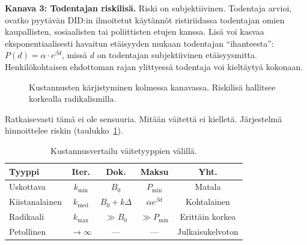 \documentclass[11pt,a4paper,twocolumn]{article}
\begin{document}
\textbf{Kanava 3: Todentajan riskilisä.} Riski on subjektiivinen. Todentaja arvioi, ovatko pyytävän DID:in ilmoitetut käytännöt ristiriidassa todentajan omien kaupallisten, sosiaalisten tai poliittisten etujen kanssa. Lisä voi kasvaa eksponentiaalisesti havaitun etäisyyden mukaan todentajan ``ihanteesta'': $P(d) = \alpha \cdot e^{\beta d}$, missä $d$ on todentajan subjektiivinen etäisyysmitta. Henkilökohtaisen ehdottoman rajan ylittyessä todentaja voi kieltäytyä kokonaan.

\begin{figure}[ht]
\centering
{}
\caption{Kustannusten kärjistyminen kolmessa kanavassa. Riskilisä hallitsee korkealla radikalismilla.}
\label{fig:radicalism}
\end{figure}

Ratkaisevasti tämä ei ole sensuuria. Mitään väitettä ei kielletä. Järjestelmä hinnoittelee riskin (taulukko~\ref{tab:costs}).

\begin{table}[ht]
\centering
\caption{Kustannusvertailu väitetyyppien välillä.}
\label{tab:costs}
\footnotesize
\begin{tabular}{@{}lcccc@{}}
\toprule
\textbf{Tyyppi} & \textbf{Iter.} & \textbf{Dok.} & \textbf{Maksu} & \textbf{Yht.} \\
\midrule
Uskottava & $k_{\min}$ & $B_0$ & $P_{\min}$ & Matala \\
Kiistanalainen & $k_{\text{med}}$ & $B_0{+}k\Delta$ & $\alpha e^{\beta d}$ & Kohtalainen \\
Radikaali & $k_{\max}$ & $\gg B_0$ & $\gg P_{\min}$ & Erittäin korkea \\
Petollinen & $\to\infty$ & --- & --- & Julkaisukelvoton \\
\bottomrule
\end{tabular}
\end{table}
\end{document}
